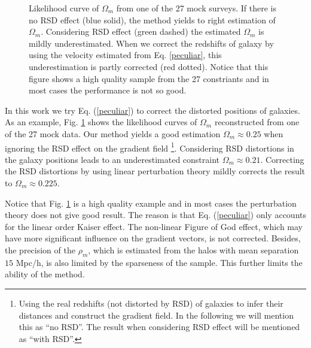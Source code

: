 \documentclass{emulateapj}
\begin{document}
\begin{figure}[tpb]
   \caption{ \label{fig_1like} Likelihood curve of $\Omega_m$ from one of the 27 mock surveys.
   If there is no RSD effect (blue solid), the method yields to right estimation of $\Omega_m$.
   Considering RSD effect (green dashed) the estimated $\Omega_m$ is mildly underestimated.
   When we correct the redshifts of galaxy by using the velocity estimated from Eq. \ref{peculiar},
   this underestimation is partly corrected (red dotted).
   Notice that this figure shows a high quality sample from the 27 constriants and in most cases the performance is not so good.}
\end{figure}

In this work we try Eq. (\ref{peculiar}) to correct the distorted positions of galaxies.
As an example, Fig. \ref{fig_1like} shows the likelihood curves of $\Omega_m$ reconstructed from one of the 27 mock data.
Our method yields a good estimation $\Omega_m\approx0.25$ when ignoring the RSD effect on the gradient field
\footnote{Using the real redshifts (not distorted by RSD) of galaxies to infer their distances and construct the gradient field.
In the following we will mention this as ``no RSD''. 
The result when considering RSD effect will be mentioned as ``with RSD''.}.
Considering RSD distortions in the galaxy positions leads to an underestimated constraint $\Omega_m\approx0.21$.
Correcting the RSD distortions by using linear perturbation theory mildly corrects the result to $\Omega_m\approx0.225$.

Notice that Fig. \ref{fig_1like} is a high quality example and in most cases the perturbation theory does not give good result.
The reason is that Eq. (\ref{peculiar}) only accounts for the linear order Kaiser effect.
The non-linear Figure of God effect, which may have more significant influence on the gradient vectors, is not corrected.
Besides, the precision of the $\rho_m$, which is estimated from the halos with mean separation $15$ Mpc/h, 
is also limited by the sparseness of the sample. This further limits the ability of the method.
\end{document}
